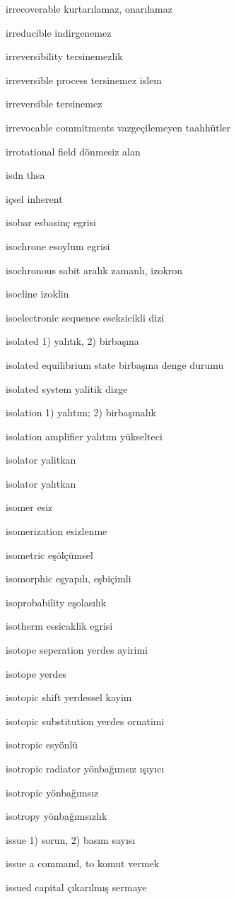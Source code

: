 \documentclass[12pt,fleqn]{article}\usepackage{../../common}
\begin{document}
irrecoverable kurtarılamaz, onarılamaz

irreducible indirgenemez

irreversibility tersinemezlik

irreversible process tersinemez islem

irreversible tersinemez

irrevocable commitments vazgeçilemeyen taahhütler

irrotational field dönmesiz alan

isdn thsa

içsel inherent

isobar esbasinç egrisi

isochrone esoylum egrisi

isochronous sabit aralık zamanlı, izokron

isocline izoklin

isoelectronic sequence eseksicikli dizi

isolated 1) yalıtık, 2) birbaşına

isolated equilibrium state birbaşına denge durumu

isolated system yalitik dizge

isolation 1) yalıtım; 2) birbaşınalık

isolation amplifier yalıtım yükselteci

isolator yalitkan

isolator yalıtkan

isomer esiz

isomerization esizlenme

isometric eşölçümsel

isomorphic eşyapılı, eşbiçimli

isoprobability eşolasılık

isotherm essicaklik egrisi

isotope seperation yerdes ayirimi

isotope yerdes

isotopic shift yerdessel kayim

isotopic substitution yerdes ornatimi

isotropic esyönlü

isotropic radiator yönbağımsız ışıyıcı

isotropic yönbağımsız

isotropy yönbağımsızlık

issue 1) sorun, 2) basım sayısı

issue a command, to komut vermek

issued capital çıkarılmış sermaye
\end{document}
